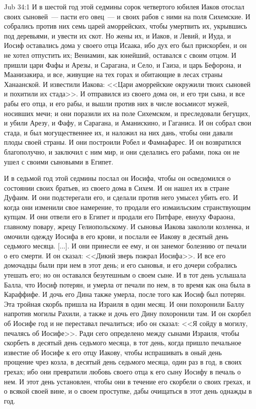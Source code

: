 \vs Jub 34:1
И в шестой год этой седмины сорок четвертого
юбилея Иаков отослал своих сыновей~--- пасти его
овец~--- и своих рабов с ними на поля Сихемские. И
собрались против них семь царей аморрейских,
чтобы умертвить их, укрывшись под деревьями, и
увести их скот. Но жены их, и Иаков, и Левий, и Иуда,
и Иосиф оставались дома у своего отца Исаака, ибо
дух его был прискорбен, и он не хотел отпустить
их; Вениамин, как юнейший, оставался с своим
отцом. И пришли цари Фафы и Арезы, и Сарагана, и
Село, и Гаиза, и царь Бефорона, и Маанизакира, и
все, живущие на тех горах и обитающие в лесах
страны Ханаанской. И известили Иакова: <<Цари
аморрейские окружили твоих сыновей и похитили их
стада>>. И отправился из своего дома он, и его
три сына, и все рабы его отца, и его рабы, и вышли
против них в числе восьмисот мужей, носивших
мечи; и они поразили их на поле Сихемском, и
преследовали бегущих, и убили Арезу, и Фафу, и
Сарагана, и Аманискино, и Гаганиса. И он собрал
свои стада, и был могущественнее их, и наложил на
них дань, чтобы они давали плоды своей страны. И
они построили Робел и Фамнафарес. И он
возвратился благополучно, и заключил с ним мир, и
они сделались его рабами, пока он не ушел с своими
сыновьями в Египет.

И в седьмой год этой седмины послал он Иосифа,
чтобы он осведомился о состоянии своих братьев,
из своего дома в Сихем. И он нашел их в стране
Дуфаим. И они подстерегали его, и сделали против
него умысел убить его. И когда они изменили свое
намерение, то продали его измаильским
странствующим купцам. И они отвели его в Египет и
продали его Питфаре, евнуху Фараона, главному
повару, жрецу Гелиопольскому. И сыновья Иакова
закололи козленка, и омочили одежду Иосифа в
его крови, и послали ее Иакову в десятый день
седьмого месяца. [...]. И они принесли ее ему, и он
занемог болезнию от печали о его смерти. И он
сказал: <<Дикий зверь пожрал Иосифа>>. И все
его домочадцы были при нем в этот день; и его
сыновья, и его дочери собрались утешать его; но он
оставался безутешным о своем сыне. И в тот день
услышала Балла, что Иосиф потерян, и умерла от
печали по нем, в то время как она была в Караффифе.
И дочь его Дина также умерла, после того как Иосиф
был потерян. Эта тройная скорбь пришла на Израиля
в один месяц. И они похоронили Баллу напротив
могилы Рахили, а также и дочь его Дину похоронили
там. И он скорбел об Иосифе год и не переставал
печалиться; ибо он сказал: <<Я сойду в могилу,
печалясь об Иосифе>>. Ради сего определено
между сынами Израиля, чтобы скорбеть в десятый
день седьмого месяца, в тот день, когда пришло
печальное известие об Иосифе к его отцу Иакову,
чтобы испрашивать в оный день прощение чрез
козла, в десятый день седьмого месяца, один раз в
год, в своих грехах; ибо они превратили любовь
своего отца к его сыну Иосифу в печаль о нем. И
этот день установлен, чтобы они в течение его
скорбели о своих грехах, и о всякой своей вине, и о
своем проступке, дабы очищаться в этот день
однажды в год.

